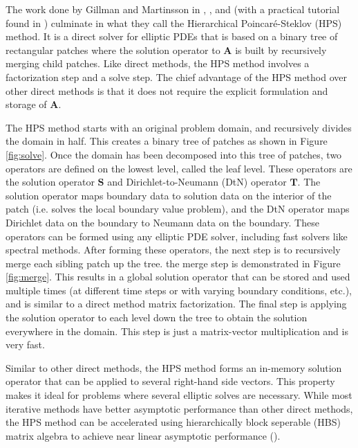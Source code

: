 The work done by Gillman and Martinsson in \citep{martinsson2004fast}, \citep{MARTINSSON2013460}, and \citep{gillman2014direct} (with a practical tutorial found in \citep{martinsson2015hierarchical}) culminate in what they call the Hierarchical Poincaré-Steklov (HPS) method. It is a direct solver for elliptic PDEs that is based on a binary tree of rectangular patches where the solution operator to $\textbf{A}$ is built by recursively merging child patches. Like direct methods, the HPS method involves a factorization step and a solve step. The chief advantage of the HPS method over other direct methods is that it does not require the explicit formulation and storage of $\textbf{A}$.

The HPS method starts with an original problem domain, and recursively divides the domain in half. This creates a binary tree of patches as shown in Figure \ref{fig:solve}. Once the domain has been decomposed into this tree of patches, two operators are defined on the lowest level, called the leaf level. These operators are the solution operator $\textbf{S}$ and Dirichlet-to-Neumann (DtN) operator $\textbf{T}$. The solution operator maps boundary data to solution data on the interior of the patch (i.e. solves the local boundary value problem), and the DtN operator maps Dirichlet data on the boundary to Neumann data on the boundary. These operators can be formed using any elliptic PDE solver, including fast solvers like spectral methods. After forming these operators, the next step is to recursively merge each sibling patch up the tree. the merge step is demonstrated in Figure \ref{fig:merge}. This results in a global solution operator that can be stored and used multiple times (at different time steps or with varying boundary conditions, etc.), and is similar to a direct method matrix factorization. The final step is applying the solution operator to each level down the tree to obtain the solution everywhere in the domain. This step is just a matrix-vector multiplication and is very fast.

Similar to other direct methods, the HPS method forms an in-memory solution operator that can be applied to several right-hand side vectors. This property makes it ideal for problems where several elliptic solves are necessary. While most iterative methods have better asymptotic performance than other direct methods, the HPS method can be accelerated using hierarchically block seperable (HBS) matrix algebra to achieve near linear asymptotic performance (\citep{gillman2014direct}).

